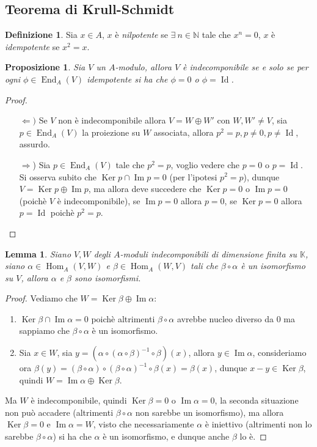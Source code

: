 \documentclass[11pt]{article}
\theoremstyle{plain}
\newtheorem{lemma}[thm]{Lemma}
\newtheorem{prop}[thm]{Proposizione}
\theoremstyle{definition}
\newtheorem{defn}{Definizione}[section]
\theoremstyle{remark}
\newcommand{\K}{\mathbb{K}}
\newcommand{\N}{\mathbb{N}}
\DeclareMathOperator{\Hom}{Hom}
\DeclareMathOperator{\End}{End}
\DeclareMathOperator{\Ker}{Ker}
\DeclareMathOperator{\Imm}{Im}
\DeclareMathOperator{\Id}{Id}
\begin{document}
	
\subsection{Teorema di Krull-Schmidt}
	\begin{defn}
		Sia $x\in A$, $x$ è \textit{nilpotente} se $\exists\ n\in \N$ tale che $x^n=0$, $x$ è \textit{idempotente} se $x^2=x$.
	\end{defn}
	\begin{prop}
		Sia $V$ un $A$-modulo, allora $V$ è indecomponibile se e solo se per ogni $\phi\in \End_A(V)$ idempotente si ha che $\phi=0$ o $\phi=\Id$.
	\end{prop}
	\begin{proof}
		\begin{enumerate}
			\item[$\Leftarrow)$] Se $V$ non è indecomponibile allora $V = W\oplus W'$ con $W,W'\neq V$, sia $p\in \End_A(V)$ la proiezione su $W$ associata, allora $p^2=p, p\neq 0, p\neq \Id$, assurdo.
			\item[$\Rightarrow$)]Sia $p\in \End_A(V)$ tale che $p^2=p$, voglio vedere che $p=0$ o $p=\Id$. Si osserva subito che $\Ker p \cap \Imm p = 0$ (per l'ipotesi $p^2=p$), dunque $V=\Ker p\oplus \Imm p$, ma allora deve succedere che $\Ker p = 0$ o $\Imm p = 0$ (poichè $V$ è indecomponibile), se $\Imm p = 0$ allora $p=0$, se $\Ker p=0$ allora $p=\Id$ poichè $p^2=p$.
		\end{enumerate}
	\end{proof}
	\begin{lemma}\label{comp_iso}
		Siano $V,W$ degli $A$-moduli indecomponibili di dimensione finita su $\K$, siano $\alpha\in \Hom_A(V,W)$ e $\beta\in \Hom_A(W,V)$ tali che $\beta\circ\alpha$ è un isomorfismo su $V$, allora $\alpha$ e $\beta$ sono isomorfismi.
	\end{lemma}
	\begin{proof}
		Vediamo che $W=\Ker\beta\oplus\Imm \alpha$:
		\begin{enumerate}
			\item $\Ker \beta\cap\Imm\alpha = 0$ poichè altrimenti $\beta\circ\alpha$ avrebbe nucleo diverso da $0$ ma sappiamo che $\beta\circ\alpha$ è un isomorfismo.
			\item Sia $x\in W$, sia $y=\left( \alpha\circ(\alpha\circ\beta)^{-1}\circ\beta \right)(x)$, allora $y\in \Imm \alpha$, consideriamo ora $\beta(y) = (\beta\circ\alpha)\circ(\beta\circ\alpha)^{-1}\circ\beta(x) = \beta(x)$, dunque $x-y\in \Ker \beta$, quindi $W=\Imm \alpha \oplus \Ker \beta$.
		\end{enumerate}
		Ma $W$ è indecomponibile, quindi $\Ker \beta = 0$ o $\Imm \alpha = 0$, la seconda situazione non può accadere (altrimenti $\beta\circ\alpha$ non sarebbe un isomorfismo), ma allora $\Ker \beta = 0$ e $\Imm \alpha = W$, visto che necessariamente $\alpha$ è iniettivo (altrimenti non lo sarebbe $\beta\circ\alpha$) si ha che $\alpha$ è un isomorfismo, e dunque anche $\beta$ lo è.
	\end{proof}
\end{document}
